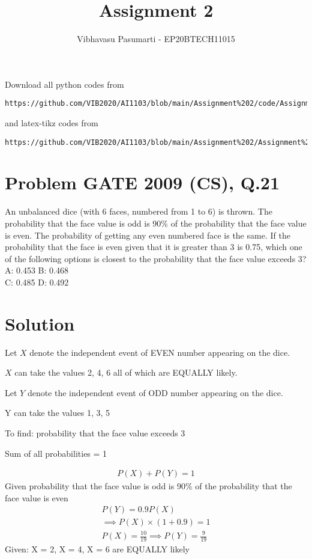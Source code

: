 \documentclass[journal,12pt,twocolumn]{IEEEtran}
\begin{document}
\title{Assignment 2}
\author{Vibhavasu Pasumarti - EP20BTECH11015}
\maketitle
\newpage
\bigskip
\renewcommand{\thefigure}{\theenumi}
\renewcommand{\thetable}{\theenumi}
Download all python codes from 
\begin{lstlisting}
https://github.com/VIB2020/AI1103/blob/main/Assignment%202/code/Assignment%202.py
\end{lstlisting}
%
and latex-tikz codes from 
%
\begin{lstlisting}
https://github.com/VIB2020/AI1103/blob/main/Assignment%202/Assignment%202.tex
\end{lstlisting}
\section{\Large Problem \large GATE 2009 (CS), Q.21}
An unbalanced dice (with 6 faces, numbered from 1 to 6) is thrown. The probability that the face value is odd is 90\% of the probability that the face value is even. The probability of getting any even numbered face is the same. If the probability that the face is even given that it is greater than 3 is 0.75, which one of the following options is closest to the probability that the face value exceeds 3?\\[7pt]
 A: 0.453\hspace{3cm}
 B: 0.468\\
 C: 0.485\hspace{3cm}
 D: 0.492\\
\section{\Large Solution}
\noindent
\begin{description}
\item Let $X$ denote the independent event of EVEN number appearing on the dice.
\item $X$ can take the values 2, 4, 6 all of which are EQUALLY likely.
\item Let $Y$ denote the independent event of ODD number appearing on the dice. 
\item Y can take the values 1, 3, 5
\item To find: probability that the face value exceeds 3
\item Sum of all probabilities = 1
\end{description}
\begin{align}
    P(X) + P(Y) = 1
\end{align}
Given probability that the face value is odd is 90\% of the probability that the face value is even
\begin{align}
    P(Y) = 0.9P(X)\\
    \implies P(X)\times (1 + 0.9) = 1\\
    P(X) = \frac{10}{19} \implies P(Y) = \frac{9}{19}
\end{align}
Given: X = 2, X = 4, X = 6 are EQUALLY likely
\end{document}
